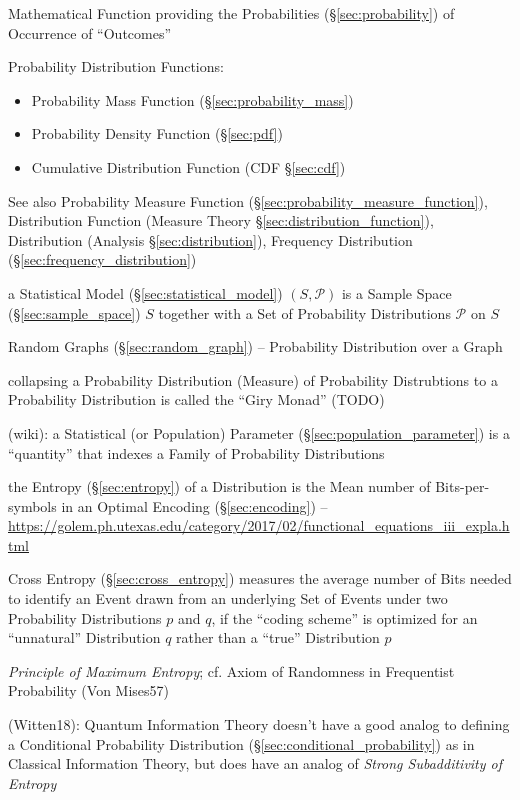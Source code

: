 Mathematical Function providing the Probabilities (\S\ref{sec:probability}) of
Occurrence of ``Outcomes''

Probability Distribution Functions:
\begin{itemize}
  \item Probability Mass Function (\S\ref{sec:probability_mass})
  \item Probability Density Function (\S\ref{sec:pdf})
  \item Cumulative Distribution Function (CDF \S\ref{sec:cdf})
\end{itemize}
See also Probability Measure Function
(\S\ref{sec:probability_measure_function}), Distribution Function (Measure
Theory \S\ref{sec:distribution_function}), Distribution (Analysis
\S\ref{sec:distribution}), Frequency Distribution
(\S\ref{sec:frequency_distribution})

a Statistical Model (\S\ref{sec:statistical_model}) $(S,\mathcal{P})$ is a
Sample Space (\S\ref{sec:sample_space}) $S$ together with a Set of Probability
Distributions $\mathcal{P}$ on $S$

\fist Random Graphs (\S\ref{sec:random_graph}) -- Probability Distribution over
a Graph

collapsing a Probability Distribution (Measure) of Probability Distrubtions to a
Probability Distribution is called the ``Giry Monad'' (TODO)

(wiki): a Statistical (or Population) Parameter
(\S\ref{sec:population_parameter}) is a ``quantity'' that indexes a Family of
Probability Distributions

the Entropy (\S\ref{sec:entropy}) of a Distribution is the Mean number
of Bits-per-symbols in an Optimal Encoding (\S\ref{sec:encoding}) --
\url{https://golem.ph.utexas.edu/category/2017/02/functional_equations_iii_expla.html}

Cross Entropy (\S\ref{sec:cross_entropy}) measures the average number of Bits
needed to identify an Event drawn from an underlying Set of Events under two
Probability Distributions $p$ and $q$, if the ``coding scheme'' is optimized for
an ``unnatural'' Distribution $q$ rather than a ``true'' Distribution $p$

\emph{Principle of Maximum Entropy}; cf. Axiom of Randomness in Frequentist
Probability (Von Mises57)

(Witten18): Quantum Information Theory doesn't have a good analog to defining a
Conditional Probability Distribution (\S\ref{sec:conditional_probability}) as in
Classical Information Theory, but does have an analog of \emph{Strong
  Subadditivity of Entropy}

